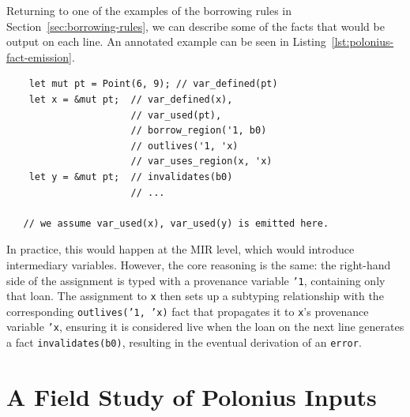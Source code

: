 \documentclass[11pt,a4paper,twoside,openany]{report}
\newenvironment{sourcecode}{\captionsetup{type=listing}}{}
\newcommand{\InRust}[1]{\texttt{#1}}
\newcommand{\InDatalog}[1]{\texttt{#1}}
\begin{document}
Returning to one of the examples of the borrowing rules in
Section~\ref{sec:borrowing-rules}, we can describe some of the facts that would
be output on each line. An annotated example can be seen in
Listing~\ref{lst:polonius-fact-emission}.

\begin{sourcecode}
  \label{lst:polonius-fact-emission}
\begin{verbatim}
    let mut pt = Point(6, 9); // var_defined(pt)
    let x = &mut pt;  // var_defined(x),
                      // var_used(pt),
                      // borrow_region('1, b0)
                      // outlives('1, 'x)
                      // var_uses_region(x, 'x)
    let y = &mut pt;  // invalidates(b0)
                      // ...

   // we assume var_used(x), var_used(y) is emitted here.
\end{verbatim}
\end{sourcecode}

In practice, this would happen at the MIR level, which would introduce
intermediary variables. However, the core reasoning is the same: the right-hand
side of the assignment is typed with a provenance variable \InRust{'1},
containing only that loan. The assignment to \InRust{x} then sets up a subtyping
relationship with the corresponding \InDatalog{outlives('1, 'x)} fact that
propagates it to \InRust{x}'s provenance variable \InRust{'x}, ensuring it is
considered live when the loan on the next line generates a fact
\InRust{invalidates(b0)}, resulting in the eventual derivation of an
\InRust{error}.

\section{A Field Study of Polonius Inputs}\label{sec:field-study-borrow}
\end{document}
